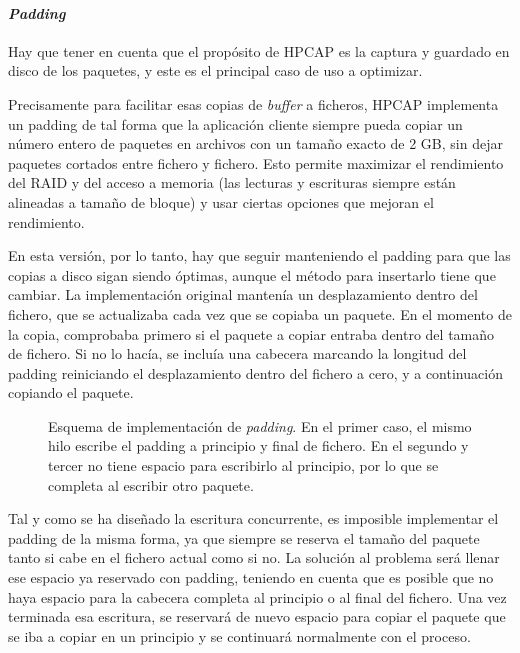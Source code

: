 \documentclass[twoside, 12pt, draft]{epstfg}
\begin{document}
\paragraph{\textit{Padding}} Hay que tener en cuenta que el propósito de HPCAP es la captura y guardado en disco de los paquetes, y este es el principal caso de uso a optimizar.

Precisamente para facilitar esas copias de \textit{buffer} a ficheros, HPCAP implementa un \gls{padding} \cite{MorenoTFM2012} de tal forma que la aplicación cliente siempre pueda copiar un número entero de paquetes en archivos con un tamaño exacto de 2 GB, sin dejar paquetes cortados entre fichero y fichero. Esto permite maximizar el rendimiento del \gls{RAID} y del acceso a memoria (las lecturas y escrituras siempre están alineadas a tamaño de bloque) y usar ciertas opciones que mejoran el rendimiento.

En esta versión, por lo tanto, hay que seguir manteniendo el \gls{padding} para que las copias a disco sigan siendo óptimas, aunque el método para insertarlo tiene que cambiar. La implementación original mantenía un desplazamiento dentro del fichero, que se actualizaba cada vez que se copiaba un paquete. En el momento de la copia, comprobaba primero si el paquete a copiar entraba dentro del tamaño de fichero. Si no lo hacía, se incluía una cabecera marcando la longitud del \gls{padding} reiniciando el desplazamiento dentro del fichero a cero, y a continuación copiando el paquete.

\begin{figure}[tbp]
\centering

\caption[Esquema de implementación del \textit{padding} en el \textit{buffer} intermedio]{Esquema de implementación de \textit{padding}. En el primer caso, el mismo hilo escribe el \gls{padding} a principio y final de fichero. En el segundo y tercer no tiene espacio para escribirlo al principio, por lo que se completa al escribir otro paquete.}
\label{fig:BufferPadding}
\end{figure}

Tal y como se ha diseñado la escritura concurrente, es imposible implementar el \gls{padding} de la misma forma, ya que siempre se reserva el tamaño del paquete tanto si cabe en el fichero actual como si no. La solución al problema será llenar ese espacio ya reservado con \gls{padding}, teniendo en cuenta que es posible que no haya espacio para la cabecera completa al principio o al final del fichero. Una vez terminada esa escritura, se reservará de nuevo espacio para copiar el paquete que se iba a copiar en un principio y se continuará normalmente con el proceso.
\end{document}
